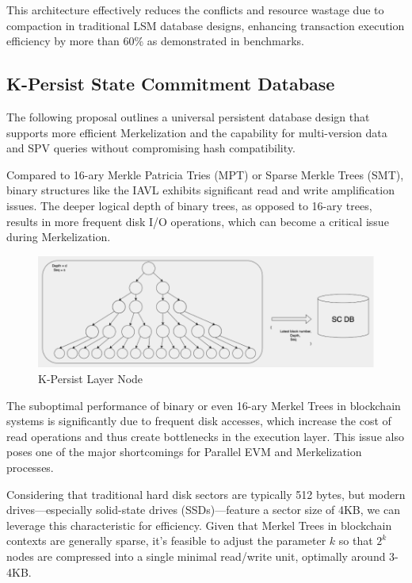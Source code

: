 This architecture effectively reduces the conflicts and resource wastage due to compaction in traditional LSM database designs, enhancing transaction execution efficiency by more than 60\% as demonstrated in benchmarks.

\subsection{K-Persist State Commitment Database}

The following proposal outlines a universal persistent database design that supports more efficient Merkelization and the capability for multi-version data and SPV queries without compromising hash compatibility. 

Compared to 16-ary Merkle Patricia Tries (MPT) or Sparse Merkle Trees (SMT), binary structures like the IAVL exhibits significant read and write amplification issues. The deeper logical depth of binary trees, as opposed to 16-ary trees, results in more frequent disk I/O operations, which can become a critical issue during Merkelization.

\begin{figure}[htp]
    \centering
    \includegraphics[width=\textwidth]{sections/images/k-persist-layer-node.png}
    \caption{K-Persist Layer Node}
    \label{fig:k_persist_layer_node}
\end{figure}

The suboptimal performance of binary or even 16-ary Merkel Trees in blockchain systems is significantly due to frequent disk accesses, which increase the cost of read operations and thus create bottlenecks in the execution layer. This issue also poses one of the major shortcomings for Parallel EVM and Merkelization processes.

Considering that traditional hard disk sectors are typically 512 bytes, but modern drives—especially solid-state drives (SSDs)—feature a sector size of 4KB, we can leverage this characteristic for efficiency. Given that Merkel Trees in blockchain contexts are generally sparse, it's feasible to adjust the parameter $k$ so that $2^k$ nodes are compressed into a single minimal read/write unit, optimally around 3-4KB.

